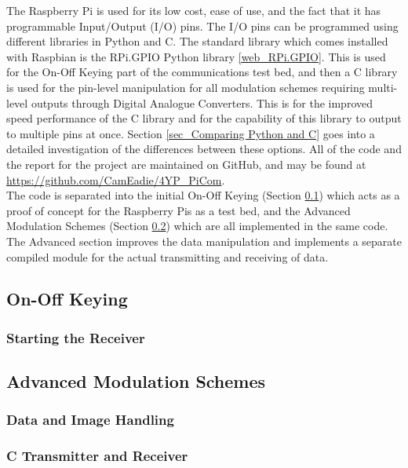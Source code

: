 \documentclass[../main.tex]{subfiles}
\begin{document}
The Raspberry Pi is used for its low cost, ease of use, and the fact that it has programmable Input/Output (I/O) pins.
The I/O pins can be programmed using different libraries in Python and C.
The standard library which comes installed with Raspbian is the RPi.GPIO Python library \ref{web_RPi.GPIO}.
This is used for the On-Off Keying part of the communications test bed, and then a C library is used for the pin-level manipulation for all modulation schemes requiring multi-level outputs through Digital Analogue Converters.
This is for the improved speed performance of the C library and for the capability of this library to output to multiple pins at once.
Section \ref{sec_Comparing Python and C} goes into a detailed  investigation of the differences between these options.
All of the code and the report for the project are maintained on GitHub, and may be found at \url{https://github.com/CamEadie/4YP_PiCom}.\\

The code is separated into the initial On-Off Keying (Section \ref{sec_On-Off Keying}) which acts as a proof of concept for the Raspberry Pis as a test bed, and the Advanced Modulation Schemes (Section \ref{sec_Advanced Modulation Schemes}) which are all implemented in the same code.
The Advanced section improves the data manipulation and implements a separate compiled module for the actual transmitting and receiving of data.

\subsection{On-Off Keying} \label{sec_On-Off Keying}

\subsubsection{Starting the Receiver}

\subsection{Advanced Modulation Schemes} \label{sec_Advanced Modulation Schemes}

\subsubsection{Data and Image Handling}
\subsubsection{C Transmitter and Receiver}
\end{document}
